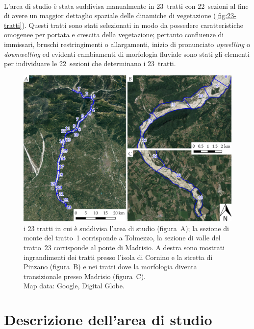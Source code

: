 %
\\
L'area di studio è stata suddivisa manualmente in 23~tratti con 22~sezioni al fine di avere un maggior dettaglio spaziale delle dinamiche di vegetazione (\vref{fig:23-tratti}). 
Questi tratti sono stati selezionati in modo da possedere caratteristiche omogenee per portata e crescita della vegetazione; 
pertanto confluenze di immissari, bruschi restringimenti o allargamenti, inizio di pronunciato \emph{upwelling} o \emph{downwelling} ed evidenti cambiamenti di morfologia fluviale sono stati gli elementi per individuare le 22~sezioni che determinano i 23~tratti.
%
\begin{figure}
	\centering
	\includegraphics[width=\textwidth]{files/tutti_23_tratti.jpeg}
	\caption[i 23 tratti in cui è suddivisa l'area di studio]{i 23 tratti in cui è suddivisa l'area di studio (figura~A); la sezione di monte del tratto~1 corrisponde a Tolmezzo, la sezione di valle del tratto~23 corrisponde al ponte di Madrisio. A destra sono mostrati ingrandimenti dei tratti presso l'isola di Cornino e la stretta di Pinzano (figura~B) e nei tratti dove la morfologia diventa transizionale presso Madrisio (figura~C).
	\\
	Map data: Google, Digital Globe.}
	\label{fig:23-tratti}
\end{figure}


\section{Descrizione dell'area di studio}
\label{sec:descr-area-studio}

